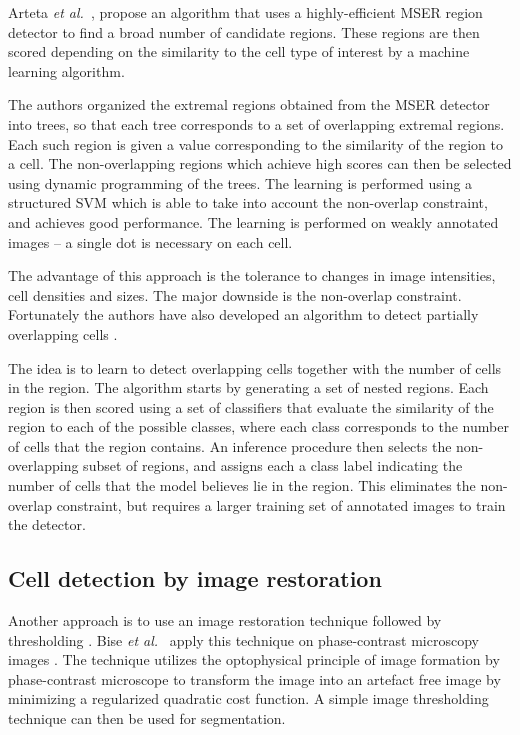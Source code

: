 Arteta \emph{et al.}~\cite{arteta12}\cite{arteta13}, propose an algorithm that uses a highly-efficient MSER region detector \cite{matas02} to find a broad number of candidate regions. These regions are then scored depending on the similarity to the cell type of interest by a machine learning algorithm. 

The authors organized the extremal regions obtained from the MSER detector into trees, so that each tree corresponds to a set of overlapping extremal regions. Each such region is given a value corresponding to the similarity of the region to a cell. The non-overlapping regions which achieve high scores can then be selected using dynamic programming of the trees. The learning is performed using a structured SVM \cite{joachims09} which is able to take into account the non-overlap constraint, and achieves good performance. The learning is performed on weakly annotated images -- a single dot is necessary on each cell.

The advantage of this approach is the tolerance to changes in image intensities, cell densities and sizes. The major downside is the non-overlap constraint. Fortunately the authors have also developed an algorithm to detect partially overlapping cells \cite{arteta13}. 

The idea is to learn to detect overlapping cells together with the number of cells in the region. The algorithm starts by generating a set of nested regions. Each region is then scored using a set of classifiers that evaluate the similarity of the region to each of the possible classes, where each class corresponds to the number of cells that the region contains. An inference procedure then selects the non-overlapping subset of regions, and assigns each a class label indicating the number of cells that the model believes lie in the region. This eliminates the non-overlap constraint, but requires a larger training set of annotated images to train the detector.

\subsection{Cell detection by image restoration \statusfirstdraft}

Another approach is to use an image restoration technique followed by thresholding \cite{bise11} \cite{huh13}. Bise \emph{et al.}~\cite{bise11} apply this technique on phase-contrast microscopy images . The technique utilizes the optophysical principle of image formation by phase-contrast microscope to transform the image into an artefact free image by minimizing a regularized quadratic cost function. A simple image thresholding technique can then be used for segmentation.

